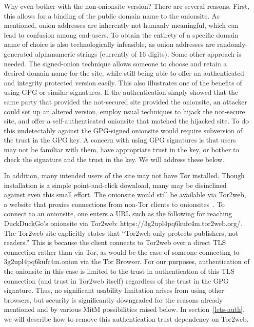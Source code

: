 \documentclass[10pt, conference, compsocconf]{styles/IEEEtran}
\begin{document}
Why even bother with the non-onionsite version? There are several
reasons. First, this allows for a binding of the public domain name to
the onionsite. As mentioned, onion addresses are inherently not
humanly meaningful, which can lead to confusion among end-users.  To
obtain the entirety of a specific domain name of choice is also
technologically infeasible, as onion addresses are randomly-generated
alphanumeric strings (currently of 16 digits). Some other approach is
needed. The signed-onion technique allows someone to choose and retain
a desired domain name for the site, while still being able to offer an
authenticated and integrity protected version easily. This also
illustrates one of the benefits of using GPG or similar signatures. If
the authentication simply showed that the same party that provided the
not-secured site provided the onionsite, an attacker could set up an
altered version, employ usual techniques to hijack the not-secure
site, and offer a self-authenticated onionsite that matched the
hijacked site.  To do this undetectably against the GPG-signed
onionsite would require subversion of the trust in the GPG key. A
concern with using GPG signatures is that users may not be familiar
with them, have appropriate trust in the key, or bother to check the
signature and the trust in the key. We will address these below.

In addition, many intended users of the site may not have Tor installed.
Though installation is a simple point-and-click download, many may be
disinclined against even this small effort. The onionsite would still
be available via Tor2web, a website that proxies connections from
non-Tor clients to onionsites~\cite{tor2web}.  To connect to an onionsite,
one enters a URL such as the following for reaching
DuckDuckGo's onionsite via Tor2web:
https://3g2upl4pq6kufc4m.tor2web.org/. The Tor2web site explicitly
states that ``Tor2web only protects publishers, not readers.'' This is
because the client connects to Tor2web over a direct TLS connection
rather than via Tor, as would be the case of someone connecting to
3g2upl4pq6kufc4m.onion via the Tor Browser.  For our purposes,
authentication of the onionsite in this case is limited to the trust
in authentication of this TLS connection (and trust in Tor2web itself)
regardless of the trust in the GPG signature. Thus, no significant
usability limitation arises from using other browsers, but security
is significantly downgraded for the reasons already mentioned and by various
MitM possibilities raised below. In section~\ref{lets-auth}, we
will describe how to remove this authentication trust dependency on Tor2web.
\end{document}
